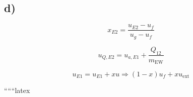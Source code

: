 

\subsection*{d)}
\[
x_{E2} = \frac{u_{E2} - u_f}{u_g - u_f}
\]

\[
u_{Q,E2} = u_{a,E1} + \frac{Q_{12}}{m_{\text{EW}}}
\]

\[
u_{E1} = u_{E1} + x u \Rightarrow (1-x) u_f + x u_{\text{ext}}
\]

``````latex